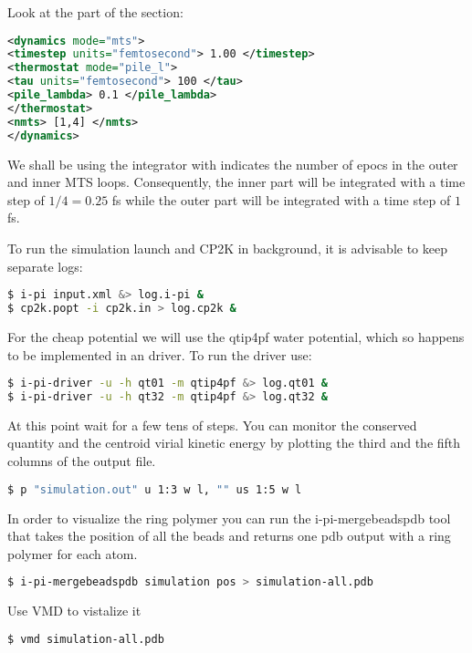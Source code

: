 \documentclass{article}
\begin{document}
\begin{Exercise}[label={water},title={Multiple time steps with an \emph{ab initio} potential}]
\Question
Look at  the  part of the  section:
\begin{lstlisting}[language=xml]
<dynamics mode="mts">
<timestep units="femtosecond"> 1.00 </timestep>
<thermostat mode="pile_l">
<tau units="femtosecond"> 100 </tau>
<pile_lambda> 0.1 </pile_lambda>
</thermostat>
<nmts> [1,4] </nmts>
</dynamics>
\end{lstlisting}
We shall be using the  integrator with  indicates the number of epocs in the outer and inner MTS loops. Consequently, the inner part will be integrated with a time step of $1/4 = 0.25$ fs  while the outer part will be integrated with a time step of $1$ fs.

\Question
To run the simulation launch \ipi{} and CP2K in background, it is advisable to keep  separate logs:
\begin{lstlisting}[language=bash]
$ i-pi input.xml &> log.i-pi &
$ cp2k.popt -i cp2k.in > log.cp2k & 
\end{lstlisting}
For the cheap potential we will use the qtip4pf water potential, which so happens to be implemented in an \ipi{} driver. To run the driver use:
\begin{lstlisting}[language=bash]
$ i-pi-driver -u -h qt01 -m qtip4pf &> log.qt01 &
$ i-pi-driver -u -h qt32 -m qtip4pf &> log.qt32 &
\end{lstlisting}
At this point wait for a few tens of steps. You can monitor the conserved quantity and the centroid virial kinetic energy by plotting the third  and the fifth columns of the output file.
\begin{lstlisting}[language=bash]
$ p "simulation.out" u 1:3 w l, "" us 1:5 w l
\end{lstlisting}
\Question
In order to visualize the ring polymer you can run the i-pi-mergebeadspdb tool that takes the position of all the beads and returns one pdb output with a ring polymer for each atom.
\begin{lstlisting}[language=bash]
$ i-pi-mergebeadspdb simulation pos > simulation-all.pdb 
\end{lstlisting}
Use VMD to vistalize it
\begin{lstlisting}[language=bash]
$ vmd simulation-all.pdb
\end{lstlisting}
\end{Exercise}
\end{document}
